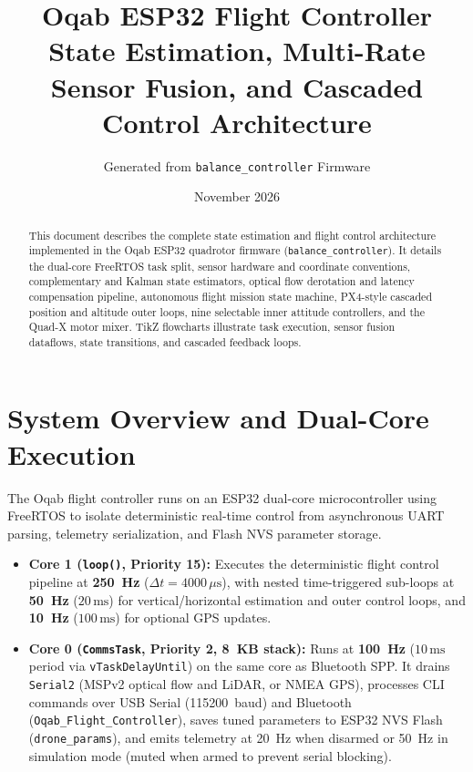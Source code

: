 \documentclass[11pt,a4paper]{article}
\title{\textbf{Oqab ESP32 Flight Controller}\\[4pt]
\large State Estimation, Multi-Rate Sensor Fusion, and Cascaded Control Architecture}
\author{Generated from \texttt{balance\_controller} Firmware}
\date{November 2026}
\begin{document}
\maketitle

\begin{abstract}
This document describes the complete state estimation and flight control architecture implemented in the Oqab ESP32 quadrotor firmware (\texttt{balance\_controller}). It details the dual-core FreeRTOS task split, sensor hardware and coordinate conventions, complementary and Kalman state estimators, optical flow derotation and latency compensation pipeline, autonomous flight mission state machine, PX4-style cascaded position and altitude outer loops, nine selectable inner attitude controllers, and the Quad-X motor mixer. TikZ flowcharts illustrate task execution, sensor fusion dataflows, state transitions, and cascaded feedback loops.
\end{abstract}

\tableofcontents
\newpage

\section{System Overview and Dual-Core Execution}

The Oqab flight controller runs on an ESP32 dual-core microcontroller using FreeRTOS to isolate deterministic real-time control from asynchronous UART parsing, telemetry serialization, and Flash NVS parameter storage.

\begin{itemize}
  \item \textbf{Core 1 (\texttt{loop()}, Priority 15):} Executes the deterministic flight control pipeline at \textbf{250~Hz} ($\Delta t = 4000\,\mu\text{s}$), with nested time-triggered sub-loops at \textbf{50~Hz} ($20\,\text{ms}$) for vertical/horizontal estimation and outer control loops, and \textbf{10~Hz} ($100\,\text{ms}$) for optional GPS updates.
  \item \textbf{Core 0 (\texttt{CommsTask}, Priority 2, 8~KB stack):} Runs at \textbf{100~Hz} ($10\,\text{ms}$ period via \texttt{vTaskDelayUntil}) on the same core as Bluetooth SPP. It drains \texttt{Serial2} (MSPv2 optical flow and LiDAR, or NMEA GPS), processes CLI commands over USB Serial (115200~baud) and Bluetooth (\texttt{Oqab\_Flight\_Controller}), saves tuned parameters to ESP32 NVS Flash (\texttt{drone\_params}), and emits telemetry at 20~Hz when disarmed or 50~Hz in simulation mode (muted when armed to prevent serial blocking).
\end{itemize}
\end{document}
